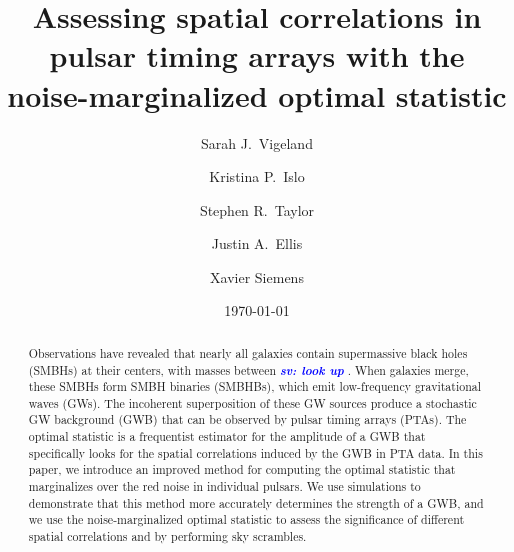 \documentclass[twocolumn,aps,prd,superscriptaddress]{revtex4-1}
\newcommand{\sv}[1]{\textcolor{blue}{\it{\textbf{sv: #1}}} }
\begin{document}
\title{Assessing spatial correlations in pulsar timing arrays with the noise-marginalized optimal statistic}


\author{Sarah J.\ Vigeland}

\author{Kristina P.\ Islo}

\author{Stephen R.\ Taylor}

\author{Justin A.\ Ellis}

\author{Xavier Siemens}

\date{\today}  

\begin{abstract}
Observations have revealed that nearly all galaxies contain supermassive black holes (SMBHs) at their centers, 
with masses between \sv{look up}. 
When galaxies merge, these SMBHs form SMBH binaries (SMBHBs), 
which emit low-frequency gravitational waves (GWs). 
The incoherent superposition of these GW sources produce a stochastic GW background (GWB) 
that can be observed by pulsar timing arrays (PTAs). 
The optimal statistic is a frequentist estimator for the amplitude of a GWB 
that specifically looks for the spatial correlations induced by the GWB in PTA data. 
In this paper, we introduce an improved method for computing the optimal statistic 
that marginalizes over the red noise in individual pulsars. 
We use simulations to demonstrate that this method 
more accurately determines the strength of a GWB, 
and we use the noise-marginalized optimal statistic to assess the 
significance of different spatial correlations and 
by performing sky scrambles.
\end{abstract}
\end{document}
